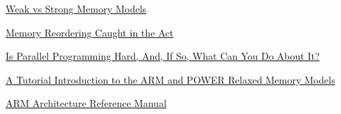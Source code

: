 \documentclass[12pt,notitlepage]{article}
\begin{document}
\href{https://preshing.com/20120930/weak-vs-strong-memory-models/}{Weak vs Strong Memory Models}

\href{https://preshing.com/20120515/memory-reordering-caught-in-the-act/}{Memory Reordering Caught in the Act}

\href{https://mirrors.edge.kernel.org/pub/linux/kernel/people/paulmck/perfbook/perfbook.2011.01.02a.pdf}%
{Is Parallel Programming Hard, And, If So, What Can You Do About It?}

\href{https://www.cl.cam.ac.uk/~pes20/ppc-supplemental/test7.pdf}%
{A Tutorial Introduction to the ARM and POWER Relaxed Memory Models}

\href{https://www.cs.utexas.edu/~simon/378/resources/ARMv7-AR_TRM.pdf}{ARM Architecture Reference Manual}
\end{document}
